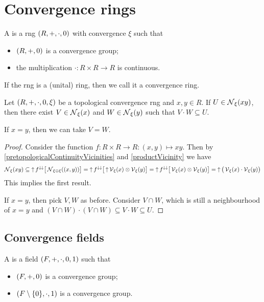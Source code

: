 \chapter{Convergence rings}
\begin{definition}
A  is a rng $\sSet{R, +, \cdot, 0}$ with convergence $\xi$ such that
\begin{itemize}
\item $\sSet{R,+,0}$ is a convergence group;
\item the multiplication $\cdot: R\times R\to R$ is continuous.
\end{itemize}
If the rng is a (unital) ring, then we call it a convergence ring.
\end{definition}

\begin{lemma} \label{ringVicinityFactorisation}
Let $\sSet{R, +,\cdot, 0, \xi}$ be a topological convergence rng and $x,y\in R$. If $U\in \operatorname{\mathcal{N}}_\xi(xy)$, then there exist $V\in \operatorname{\mathcal{N}}_\xi(x)$ and $W\in \operatorname{\mathcal{N}}_\xi(y)$ such that $V\cdot W\subseteq U$.

If $x=y$, then we can take $V = W$.
\end{lemma}
\begin{proof}
Consider the function $f: R\times R \to R: (x,y)\mapsto xy$. Then by \ref{pretopologicalContinuityVicinities} and \ref{productVicinity} we have
\[ \operatorname{\mathcal{N}}_\xi(xy) \subseteq \operatorname{\uparrow} f^{\downarrow\downarrow}\big[\operatorname{\mathcal{N}}_{\xi\otimes\xi}((x,y))\big] = \operatorname{\uparrow} f^{\downarrow\downarrow}\big[\operatorname{\uparrow} \operatorname{\mathcal{V}}_\xi(x)\otimes \operatorname{\mathcal{V}}_\xi(y)\big] = \operatorname{\uparrow} f^{\downarrow\downarrow}\big[\operatorname{\mathcal{V}}_\xi(x)\otimes \operatorname{\mathcal{V}}_\xi(y)\big] = \operatorname{\uparrow} \big(\operatorname{\mathcal{V}}_\xi(x)\cdot \operatorname{\mathcal{V}}_\xi(y)\big) \]
This implies the first result.

If $x=y$, then pick $V,W$ as before. Consider $V\cap W$, which is still a neighbourhood of $x=y$ and $(V\cap W)\cdot(V\cap W) \subseteq V\cdot W \subseteq U$.
\end{proof}

\section{Convergence fields}
\begin{definition}
A  is a field $\sSet{F, +, \cdot, 0,1}$ such that
\begin{itemize}
\item $\sSet{F,+,0}$ is a convergence group;
\item $\sSet{F\setminus\{0\},\cdot, 1}$ is a convergence group.
\end{itemize}
\end{definition}

